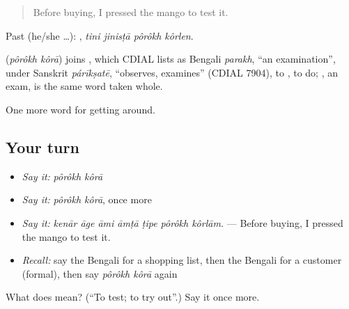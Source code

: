 \begin{quote}
Before buying, I pressed the mango to test it.
\end{quote}

Past (he/she …):    , \emph{tini jinisṭā pôrôkh kôrlen}.

\begin{cousinweb}
\textbf{ } (\emph{pôrôkh kôrā}) joins , which CDIAL lists as Bengali \emph{parakh}, \textquotedblleft{}an examination\textquotedblright{}, under Sanskrit \emph{párīkṣatē}, \textquotedblleft{}observes, examines\textquotedblright{} (CDIAL 7904), to , to do; , an exam, is the same word taken whole.
\end{cousinweb}

\begin{grammarlens}[title={What you've built}]
One more word for getting around.
\end{grammarlens}

\subsection*{Your turn}
\begin{itemize}
\raggedright
  \item \emph{Say it:} \emph{pôrôkh kôrā}
  \item \emph{Say it:} \emph{pôrôkh kôrā}, once more
  \item \emph{Say it:} \emph{kenār āge āmi āmṭā ṭipe pôrôkh kôrlām.} — Before buying, I pressed the mango to test it.
  \item \emph{Recall:} say the Bengali for a shopping list, then the Bengali for a customer (formal), then say \emph{pôrôkh kôrā} again
\end{itemize}

\begin{tcolorbox}[breakable,colback=teal!4,colframe=teal!35!black,title={Before you move on}]
What does   mean? (\textquotedblleft{}To test; to try out\textquotedblright{}.) Say it once more.
\end{tcolorbox}
